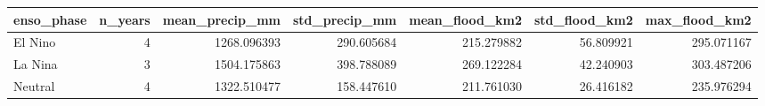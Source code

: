\begin{tabular}{lrrrrrr}
\toprule
enso\_phase & n\_years & mean\_precip\_mm & std\_precip\_mm & mean\_flood\_km2 & std\_flood\_km2 & max\_flood\_km2 \\
\midrule
El Nino & 4 & 1268.096393 & 290.605684 & 215.279882 & 56.809921 & 295.071167 \\
La Nina & 3 & 1504.175863 & 398.788089 & 269.122284 & 42.240903 & 303.487206 \\
Neutral & 4 & 1322.510477 & 158.447610 & 211.761030 & 26.416182 & 235.976294 \\
\bottomrule
\end{tabular}
